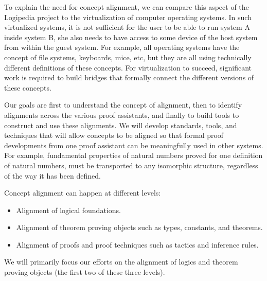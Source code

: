 To explain the need for concept alignment, we can compare this aspect
of the Logipedia project to the virtualization of computer operating
systems. In such virtualized systems, it is not sufficient for the
user to be able to run system A inside system B, she also needs to
have access to some device of the host system from within the guest
system. For example, all operating systems have the concept of file
systems, keyboards, mice, etc, but they are all using technically
different definitions of these concepts.  For virtualization to
succeed, significant work is required to build bridges that formally
connect the different versions of these concepts.

Our goals are first to understand the concept of alignment, then to
identify alignments across the various proof assistants, and finally
to build tools to construct and use these alignments. We will develop
standards, tools, and techniques that will allow concepts to be
aligned so that formal proof developments from one proof assistant can
be meaningfully used in other systems. For example, fundamental
properties of natural numbers proved for one definition of natural
numbers, must be transported to any isomorphic structure, regardless
of the way it has been defined.

Concept alignment can happen at different levels:
\begin{itemize}
\item Alignment of logical foundations.
\item Alignment of theorem proving objects such as types,
  constants, and theorems.
\item Alignment of proofs and proof techniques such as tactics and
  inference rules.
\end{itemize}
We will primarily focus our efforts on the alignment of
logics and theorem proving objects (the first two of these three levels).

\newcommand{\parag}[1]{\medskip \noindent {\bf #1}}

